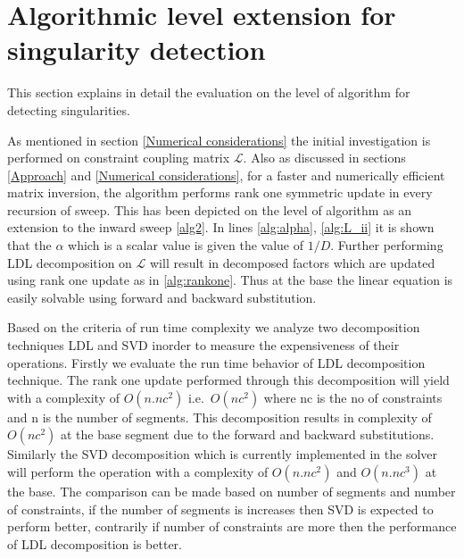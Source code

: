 \section{Algorithmic level extension for singularity detection}
This section explains in detail the evaluation on the level of algorithm for detecting singularities. 



As mentioned in section \ref{Numerical considerations} the initial investigation is performed on constraint coupling matrix $\mathcal{L}$. Also as discussed in sections \ref{Approach} and \ref{Numerical considerations}, for a faster and numerically efficient matrix inversion, the algorithm performs rank one symmetric update in every recursion of sweep. This has been depicted on the level of algorithm as an extension to the inward sweep \ref{alg2}. In lines \ref{alg:alpha}, \ref{alg:L_ii} it is shown that the $\alpha$ which is a scalar value is given the value of $1/D$. Further performing LDL decomposition on $\mathcal{L}$ will result in decomposed factors which are updated using rank one update as in \ref{alg:rankone}. Thus at the base the linear equation is easily solvable using forward and backward substitution.


Based on the criteria of run time complexity we analyze two decomposition techniques LDL and SVD inorder to measure the expensiveness of their operations. Firstly we evaluate the run time behavior of LDL decomposition technique. The rank one update performed through this decomposition will yield with a complexity of $O(n.nc^2)$ i.e.\ $O(nc^2)$ where nc is the no of constraints and n is the number of segments. This decomposition results in complexity of $O(nc^2)$ at the base segment due to the forward and backward substitutions. Similarly the SVD decomposition which is currently implemented in the solver will perform the operation with a complexity of $O(n.nc^2)$ and $O(n.nc^3)$ at the base. The comparison can be made based on number of segments and number of constraints, if the number of segments is increases then SVD is expected to perform better, contrarily if number of constraints are more then the performance of LDL decomposition is better. 

